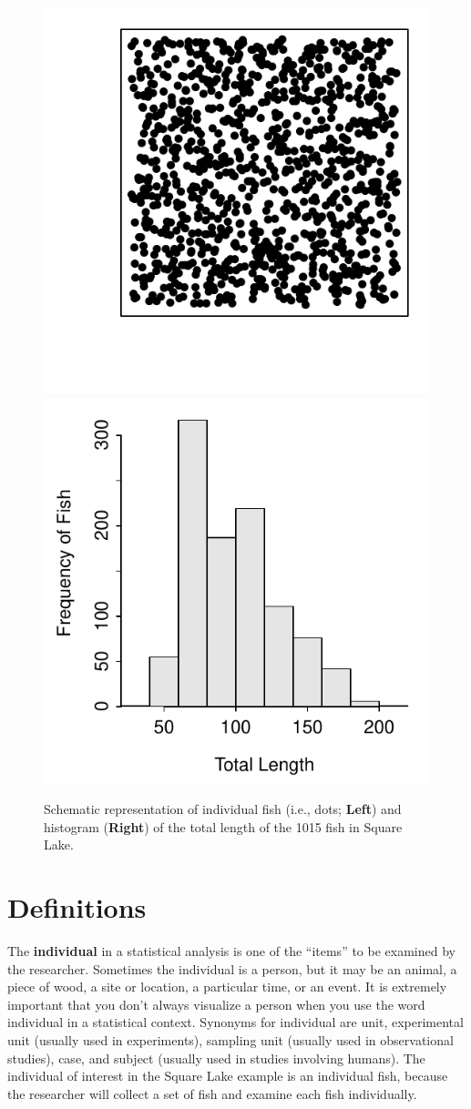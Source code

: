 \documentclass[10pt,openany]{book}\usepackage[]{graphicx}\usepackage[]{color}
\newenvironment{knitrout}{}{} %
\begin{document}
\begin{knitrout}
\color{fgcolor}\begin{figure}[hbtp]

{\centering \includegraphics[width=.4\linewidth]{Figs/SquareLakePopn-1} 
\includegraphics[width=.4\linewidth]{Figs/SquareLakePopn-2} 

}

\caption[Schematic representation of individual fish (i.e., dots]{Schematic representation of individual fish (i.e., dots; \textbf{Left}) and histogram (\textbf{Right}) of the total length of the 1015 fish in Square Lake.}\label{fig:SquareLakePopn}
\end{figure}


\end{knitrout}

\vspace{-24pt}
\section{Definitions} \label{sect:IVPPSS}
\vspace{-12pt}
The \textbf{individual} in a statistical analysis is one of the ``items'' to be examined by the researcher.  Sometimes the individual is a person, but it may be an animal, a piece of wood, a site or location, a particular time, or an event.  It is extremely important that you don't always visualize a person when you use the word individual in a statistical context.  Synonyms for individual are unit, experimental unit (usually used in experiments), sampling unit (usually used in observational studies), case, and subject (usually used in studies involving humans).  The individual of interest in the Square Lake example is an individual fish, because the researcher will collect a set of fish and examine each fish individually.
\end{document}
